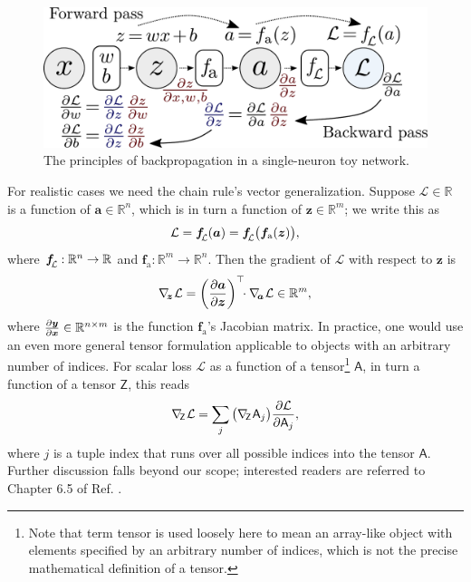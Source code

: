 \documentclass[11pt, a4paper]{article}
\renewcommand{\vec}[1]{\bm{#1}}
\newcommand{\tensor}[1]{\mathsf{#1}}
\renewcommand{\grad}{\nabla}
\newcommand{\z}{\vec{z}}
\renewcommand{\a}{\vec{a}}
\newcommand{\subgrad}[1]{\grad_{\mspace{-4mu}#1}\mspace{1mu}} %
\begin{document}
\begin{figure}[htb!]
    \centering
    \includegraphics[width=0.80\linewidth]{vector/backprop-toy.pdf}
    \vspace{-3mm}
    \caption{The principles of backpropagation in a single-neuron toy network.}
    \label{fig:backprop-toy}
\end{figure}

For realistic cases we need the chain rule's vector generalization.
Suppose $ \mathcal{L} \in \mathbb{R} $ is a function of $ \a \in \mathbb{R}^{n} $, which is in turn a function of $ \z \in \mathbb{R}^{m} $; we write this as
\begin{equation*}
    \mathcal{L} = \vec{f}_{\raisebox{-0.4ex}{\scalebox{0.7}{$\mspace{-3mu} \mathcal{L}$}}} (\vec{a}) = \vec{f}_{\raisebox{-0.4ex}{\scalebox{0.7}{$\mspace{-3mu} \mathcal{L}$}}} \big( \vec{f}_{\text{a}} (\z) \big),
\end{equation*}
where $ \vec{f}_{\raisebox{-0.4ex}{\scalebox{0.7}{$\mspace{-3mu} \mathcal{L}$}}} : \mathbb{R}^{n} \to \mathbb{R} $ and $ \vec{f}_{\text{a}} : \mathbb{R}^{m} \to \mathbb{R}^{n} $.
Then the gradient of $ \mathcal{L} $ with respect to $ \z $ is
\begin{equation*}
    \subgrad{\z} \mathcal{L} = \left( \pdv{\a}{\z} \right)^{\top} \mspace{-7mu} \cdot \subgrad{\a} \mathcal{L} \in \mathbb{R}^{m},
\end{equation*}
where $ \pdv{\vec{y}}{\vec{x}} \in \mathbb{R}^{n \times m} $ is the function $ \vec{f}_{\text{a}} $'s Jacobian matrix.
In practice, one would use an even more general tensor formulation applicable to objects with an arbitrary number of indices.
For scalar loss $ \mathcal{L} $ as a function of a tensor\footnote{Note that term tensor is used loosely here to mean an array-like object with elements specified by an arbitrary number of indices, which is not the precise mathematical definition of a tensor.} $ \tensor{A} $, in turn a function of a tensor $ \tensor{Z} $, this reads
\begin{equation*}
    \subgrad{\tensor{Z}} \mathcal{L} = \sum_{j} \big( \subgrad{\tensor{Z}} \tensor{A}_{j} \big) \pdv{\mathcal{L}}{\tensor{A}_{j}},
\end{equation*}
where $ j $ is a tuple index that runs over all possible indices into the tensor $ \tensor{A} $.
Further discussion falls beyond our scope; interested readers are referred to Chapter 6.5 of Ref. \cite{goodfellow}.
\end{document}
